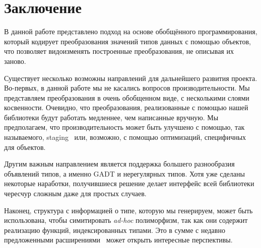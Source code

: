 \section{Заключение}
\label{sec:futurework}

В данной работе представлено подход на основе обобщённого программирования, который кодирует преобразования значений типов данных с помощью объектов, что позволяет видоизменять построенные преобразования, не описывая их заново.

Существует несколько возможны направлений для дальнейшего развития проекта. Во-первых, в данной работе мы не касались вопросов производительности. Мы представляем преобразования в очень обобщенном виде, с несколькими слоями косвенности. Очевидно, что преобразования, реализованные с помощью нашей библиотеки будут работать медленнее, чем написанные вручную. Мы предполагаем, что производительность может быть
улучшено с помощью, так называемого, staging~\cite{Staged} или, возможно, с помощью оптимизаций, специфичных для объектов.

Другим важным направлением является поддержка большего разнообразия объявлений типов, а именно GADT и нерегулярных типов. Хотя уже сделаны некоторые наработки, получившиеся решение делает интерфейс всей библиотеки чересчур сложным даже для простых случаев.

Наконец, структура с информацией о типе, которую мы генерируем, может быть использована, чтобы симитировать \emph{ad-hoc} полиморфизм, так как они содержит реализацию функций, индексированных типами. Это в сумме с недавно предложенными расширениями~\cite{ModularImplicits} может открыть интересные перспективы.

